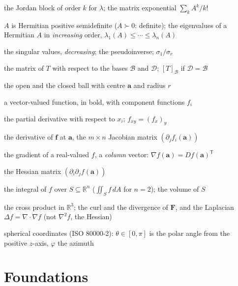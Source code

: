 \documentclass{sdbook-eng}
\begin{document}
\begin{symbols}
\item[$J_k(\lambda)$, $e^A$] the Jordan block of order $k$ for $\lambda$; the matrix exponential $\sum_kA^k/k!$
\item[$A\succeq0$, $\lambda_k(A)$] $A$ is Hermitian positive semidefinite ($A\succ0$: definite); the eigenvalues of a Hermitian $A$ in \emph{increasing} order, $\lambda_1(A)\le\cdots\le\lambda_n(A)$
\item[$\sigma_i(A)$, $A^+$, $\kappa_2(A)$] the singular values, \emph{decreasing}; the pseudoinverse; $\sigma_1/\sigma_r$
\item[{$[T]_{\mathcal D\leftarrow\mathcal B}$}] the matrix of $T$ with respect to the bases $\mathcal B$ and $\mathcal D$; $[T]_{\mathcal B}$ if $\mathcal D=\mathcal B$
\item[$B(\mathbf a,r)$, $\bar B(\mathbf a,r)$] the open and the closed ball with centre $\mathbf a$ and radius $r$
\item[$\mathbf f=(f_1,\ldots,f_m)$] a vector-valued function, in bold, with component functions $f_i$
\item[$\partial_if$, $\partial f/\partial x_i$, $f_{x_i}$] the partial derivative with respect to $x_i$; $f_{xy}=(f_x)_y$
\item[$D\mathbf f(\mathbf a)$] the derivative of $\mathbf f$ at $\mathbf a$, the $m\times n$ Jacobian matrix $(\partial_jf_i(\mathbf a))$
\item[$\nabla f(\mathbf a)$] the gradient of a real-valued $f$, a \emph{column} vector: $\nabla f(\mathbf a)=Df(\mathbf a)^{\mathsf T}$
\item[$\nabla^2f(\mathbf a)$] the Hessian matrix $(\partial_i\partial_jf(\mathbf a))$
\item[$\int_Sf(\mathbf x)\,d\mathbf x$, $\operatorname{vol}(S)$] the integral of $f$ over $S\subseteq\mathbb R^n$ ($\iint_Sf\,dA$ for $n=2$); the volume of $S$
\item[$\mathbf x\times\mathbf y$, $\nabla\times\mathbf F$, $\nabla\cdot\mathbf F$] the cross product in $\mathbb R^3$; the curl and the divergence of $\mathbf F$, and the Laplacian $\Delta f=\nabla\cdot\nabla f$ (not $\nabla^2f$, the Hessian)
\item[$(r,\theta,\varphi)$] spherical coordinates (ISO 80000-2): $\theta\in[0,\pi]$ is the polar angle from the positive $z$-axis, $\varphi$ the azimuth
\end{symbols}

\mainmatter
\part{Foundations}




\end{document}
